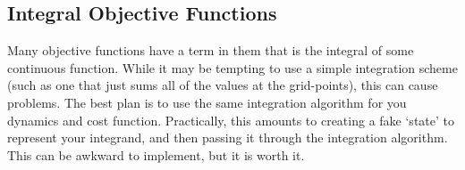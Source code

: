 \subsection{Integral Objective Functions}

Many objective functions have a term in them that is the integral of some continuous function. While it may be tempting to use a simple integration scheme (such as one that just sums all of the values at the grid-points), this can cause problems. The best plan is to use the same integration algorithm for you dynamics and cost function. Practically, this amounts to creating a fake `state' to represent your integrand, and then passing it through the integration algorithm. This can be awkward to implement, but it is worth it. 

